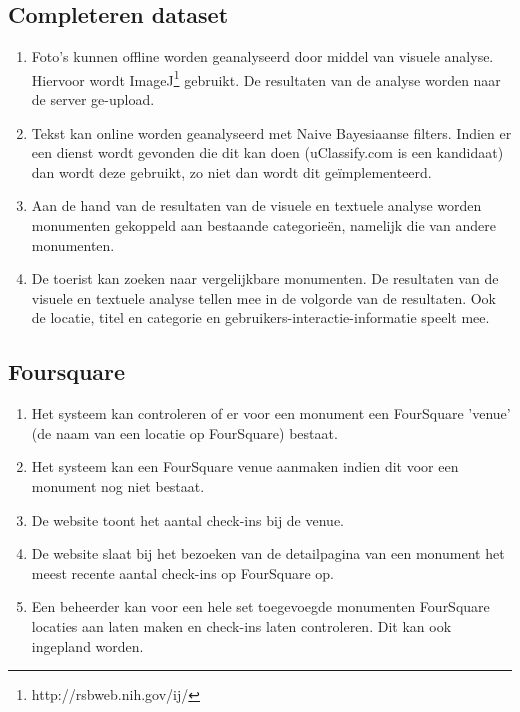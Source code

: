 \documentclass[a4paper,10pt]{article}
\begin{document}
            \subsection{Completeren dataset}
            \begin{enumerate}
                \item Foto's kunnen offline worden geanalyseerd door middel van visuele analyse. Hiervoor wordt ImageJ\footnote{http://rsbweb.nih.gov/ij/} gebruikt. De resultaten van de analyse worden naar de server ge-upload.
                \item Tekst kan online worden geanalyseerd met Naive Bayesiaanse filters. Indien er een dienst wordt gevonden die dit kan doen (uClassify.com is een kandidaat) dan wordt deze gebruikt, zo niet dan wordt dit ge\"implementeerd.
                \item Aan de hand van de resultaten van de visuele en textuele analyse worden monumenten gekoppeld aan bestaande categorie\"en, namelijk die van andere monumenten.
                \item De toerist kan zoeken naar vergelijkbare monumenten. De resultaten van de visuele en textuele analyse tellen mee in de volgorde van de resultaten. Ook de locatie, titel en categorie en gebruikers-interactie-informatie speelt mee.
            \end{enumerate}
    
            \subsection{Foursquare}
            \begin{enumerate}
                \item Het systeem kan controleren of er voor een monument een FourSquare 'venue' (de naam van een locatie op FourSquare) bestaat.
                \item Het systeem kan een FourSquare venue aanmaken indien dit voor een monument nog niet bestaat.
                \item De website toont het aantal check-ins bij de venue.
                \item De website slaat bij het bezoeken van de detailpagina van een monument het meest recente aantal check-ins op FourSquare op.
                \item Een beheerder kan voor een hele set toegevoegde monumenten FourSquare locaties aan laten maken en check-ins laten controleren. Dit kan ook ingepland worden.
            \end{enumerate}
                
\end{document}
